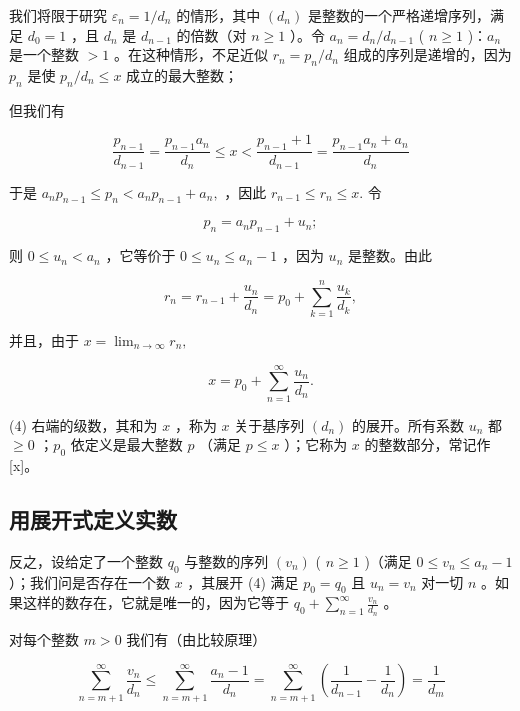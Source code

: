 我们将限于研究 \(\varepsilon_{n} = 1 / d_{n}\) 的情形，其中 \((d_n)\) 是整数的一个严格递增序列，满足 \(d_0 = 1\) ，且 \(d_n\) 是 \(d_{n-1}\) 的倍数（对 \(n \geqslant 1\) ）。令 \(a_n = d_n / d_{n-1}\) ( \(n \geqslant 1\) )：\(a_n\) 是一个整数 \(>1\) 。在这种情形，不足近似 \(r_n = p_n / d_n\) 组成的序列是递增的，因为 \(p_n\) 是使 \(p_n / d_n \leqslant x\) 成立的最大整数；

但我们有

\[
\frac {p _ {n - 1}}{d _ {n - 1}} = \frac {p _ {n - 1} a _ {n}}{d _ {n}} \leqslant x <   \frac {p _ {n - 1} + 1}{d _ {n - 1}} = \frac {p _ {n - 1} a _ {n} + a _ {n}}{d _ {n}}
\]

于是 \(a_{n}p_{n - 1}\leqslant p_{n} <   a_{n}p_{n - 1} + a_{n},\) ，因此 \(r_{n - 1}\leqslant r_n\leqslant x.\) 令

\[
p _ {n} = a _ {n} p _ {n - 1} + u _ {n};\tag{2}
\]

则 \(0 \leqslant u_n < a_n\) ，它等价于 \(0 \leqslant u_n \leqslant a_n - 1\) ，因为 \(u_n\) 是整数。由此

\[
r _ {n} = r _ {n - 1} + \frac {u _ {n}}{d _ {n}} = p _ {0} + \sum_ {k = 1} ^ {n} \frac {u _ {k}}{d _ {k}},\tag{3}
\]

并且，由于 \(x = \lim_{n\to \infty}r_n,\)

\[
x = p _ {0} + \sum_ {n = 1} ^ {\infty} \frac {u _ {n}}{d _ {n}}.\tag{4}
\]

(4) 右端的级数，其和为 \(x\) ，称为 \(x\) 关于基序列 \((d_n)\) 的展开。所有系数 \(u_n\) 都 \(\geqslant 0\) ；\(p_0\) 依定义是最大整数 \(p\) （满足 \(p \leqslant x\) ）；它称为 \(x\) 的整数部分，常记作 {[}x{]}。

\subsection{用展开式定义实数}

反之，设给定了一个整数 \(q_0\) 与整数的序列 \((v_n)\) ( \(n \geqslant 1\) )（满足 \(0 \leqslant v_n \leqslant a_n - 1\) ）；我们问是否存在一个数 \(x\) ，其展开 (4) 满足 \(p_0 = q_0\) 且 \(u_n = v_n\) 对一切 \(n\) 。如果这样的数存在，它就是唯一的，因为它等于 \(q_0 + \sum_{n=1}^{\infty} \frac{v_n}{d_n}\) 。

对每个整数 \(m > 0\) 我们有（由比较原理）

\[
\sum_ {n = m + 1} ^ {\infty} \frac {v _ {n}}{d _ {n}} \leqslant \sum_ {n = m + 1} ^ {\infty} \frac {a _ {n} - 1}{d _ {n}} = \sum_ {n = m + 1} ^ {\infty} \left(\frac {1}{d _ {n - 1}} - \frac {1}{d _ {n}}\right) = \frac {1}{d _ {m}}
\]

